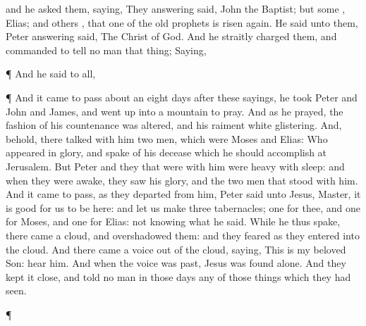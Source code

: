{and he
asked
them,
saying,
{}
They
answering
said,
John the
Baptist;
but
some
{},
Elias;
and
others
{},
that
one of
the
old
prophets is risen
again.
He
said unto
them,
{}
Peter
answering
said, The
Christ of
God.
And he straitly
charged
them, and
commanded
{} to
tell no
man that
thing;
Saying,
{}
\par }{\PP {}¶
And he
said
to
{}
all,
{}
\par }{\PP {}¶
And it came to
pass
about
an
eight
days
after
these
sayings, he
took
Peter
and
John
and
James, and went
up
into a
mountain to
pray.
And
as
he
prayed, the
fashion
of
his
countenance was
altered,
and
his
raiment
{}
white
{}
glistering.
And,
behold, there talked
with
him
two
men,
which
were
Moses
and
Elias:
Who
appeared
in
glory, and
spake
of
his
decease
which he
should
accomplish
at
Jerusalem.
But
Peter
and they that
were
with
him were
heavy with
sleep:
and when they were
awake, they
saw
his
glory,
and
the
two
men that stood
with
him.
And it came to
pass,
as
they
departed
from
him,
Peter
said
unto
Jesus,
Master, it
is
good for
us to
be
here:
and let us
make
three
tabernacles;
one for
thee,
and
one for
Moses,
and
one for
Elias:
not
knowing
what he
said.
While
he
thus
spake, there
came a
cloud,
and
overshadowed
them:
and they
feared
as
they
entered
into the
cloud.
And there
came a
voice
out of the
cloud,
saying,
This
is
my
beloved
Son:
hear
him.
And
when the
voice was
past,
Jesus was
found
alone.
And
they kept it
close,
and
told no
man
in
those
days
any of those things
which they had
seen.
\par }{\PP {}¶
}

